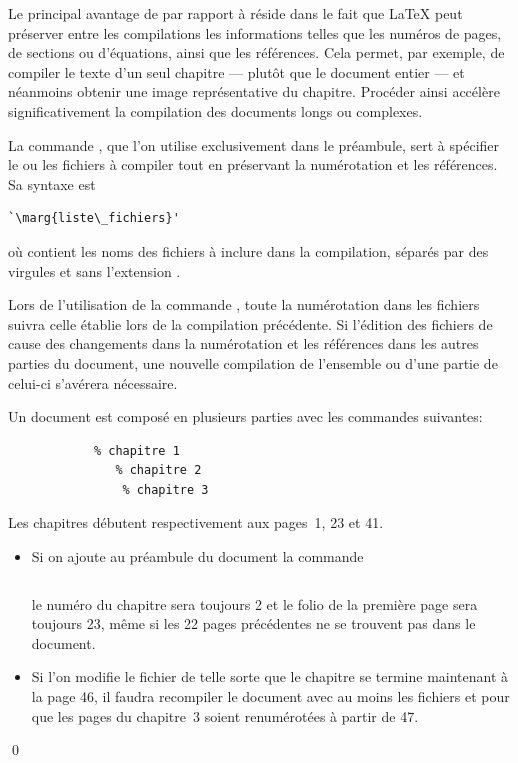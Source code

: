Le principal avantage de \cmd{} par rapport à \cmd{}
réside dans le fait que {\LaTeX} peut préserver entre les compilations
les informations telles que les numéros de pages, de sections ou
d'équations, ainsi que les références. Cela permet, par exemple, de
compiler le texte d'un seul chapitre --- plutôt que le document entier
--- et néanmoins obtenir une image représentative du chapitre.
Procéder ainsi accélère significativement la compilation des documents
longs ou complexes.

La commande \cmd{}, que l'on utilise exclusivement dans le
préambule, sert à spécifier le ou les fichiers à compiler tout en
préservant la numérotation et les références. Sa syntaxe est
\begin{lstlisting}
`\marg{liste\_fichiers}'
\end{lstlisting}
où  contient les noms des fichiers à
inclure dans la compilation, séparés par des virgules et sans
l'extension .

Lors de l'utilisation de la commande \cmd{}, toute la
numérotation dans les fichiers  suivra celle
établie lors de la compilation précédente. Si l'édition des fichiers
de  cause des changements dans la numérotation
et les références dans les autres parties du document, une nouvelle
compilation de l'ensemble ou d'une partie de celui-ci s'avérera
nécessaire.

\begin{exemple}
  Un document est composé en plusieurs parties avec les commandes
  suivantes:
\begin{lstlisting}
            % chapitre 1
               % chapitre 2
                % chapitre 3
\end{lstlisting}
  Les chapitres débutent respectivement aux pages~1, 23 et 41.
  \begin{itemize}
  \item Si on ajoute au préambule du document la commande
\begin{lstlisting}

\end{lstlisting}
    le numéro du chapitre sera toujours 2 et le folio de
    la première page sera toujours 23, même si les 22 pages
    précédentes ne se trouvent pas dans le document.
  \item Si l'on modifie le fichier  de telle
    sorte que le chapitre se termine maintenant à la page 46, il
    faudra recompiler le document avec au moins les fichiers
     et  pour que les pages du
    chapitre~3 soient renumérotées à partir de 47.
  \end{itemize}
  \qed
\end{exemple}

